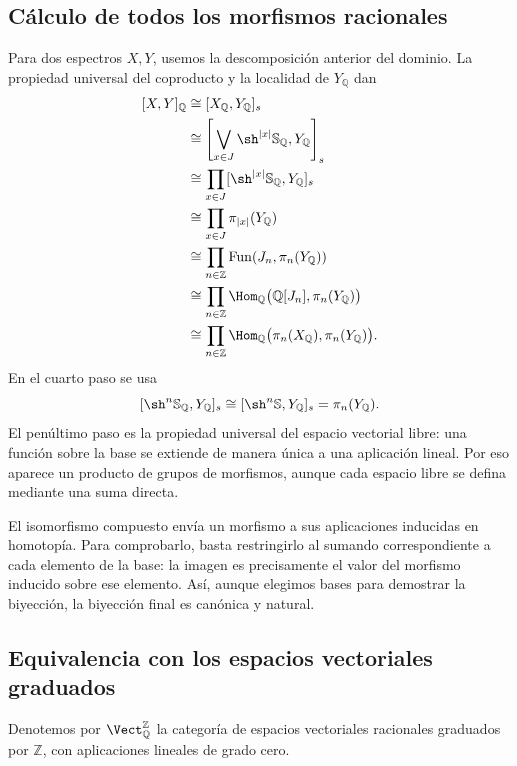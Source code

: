 \subsection{Cálculo de todos los morfismos racionales}
Para dos espectros $X,Y$, usemos la descomposición anterior del dominio. La propiedad universal del coproducto y la localidad de $Y_{\mathbb Q}$ dan
\[
\begin{aligned}
[X,Y]_{\mathbb Q}
&\cong[X_{\mathbb Q},Y_{\mathbb Q}]_s\\
&\cong\left[\bigvee_{x\in J}\sh^{|x|}\mathbb S_{\mathbb Q},Y_{\mathbb Q}\right]_s\\
&\cong\prod_{x\in J}[\sh^{|x|}\mathbb S_{\mathbb Q},Y_{\mathbb Q}]_s\\
&\cong\prod_{x\in J}\pi_{|x|}(Y_{\mathbb Q})\\
&\cong\prod_{n\in\mathbb Z}\operatorname{Fun}(J_n,\pi_n(Y_{\mathbb Q}))\\
&\cong\prod_{n\in\mathbb Z}\Hom_{\mathbb Q}
\bigl(\mathbb Q[J_n],\pi_n(Y_{\mathbb Q})\bigr)\\
&\cong\prod_{n\in\mathbb Z}\Hom_{\mathbb Q}
\bigl(\pi_n(X_{\mathbb Q}),\pi_n(Y_{\mathbb Q})\bigr).
\end{aligned}
\]
En el cuarto paso se usa
\[
[\sh^n\mathbb S_{\mathbb Q},Y_{\mathbb Q}]_s
\cong[\sh^n\mathbb S,Y_{\mathbb Q}]_s=\pi_n(Y_{\mathbb Q}).
\]
El penúltimo paso es la propiedad universal del espacio vectorial libre: una función sobre la base se extiende de manera única a una aplicación lineal. Por eso aparece un producto de grupos de morfismos, aunque cada espacio libre se defina mediante una suma directa.

El isomorfismo compuesto envía un morfismo a sus aplicaciones inducidas en homotopía. Para comprobarlo, basta restringirlo al sumando correspondiente a cada elemento de la base: la imagen es precisamente el valor del morfismo inducido sobre ese elemento. Así, aunque elegimos bases para demostrar la biyección, la biyección final es canónica y natural.

\subsection{Equivalencia con los espacios vectoriales graduados}
Denotemos por $\Vect_{\mathbb Q}^{\mathbb Z}$ la categoría de espacios vectoriales racionales graduados por $\mathbb Z$, con aplicaciones lineales de grado cero.

